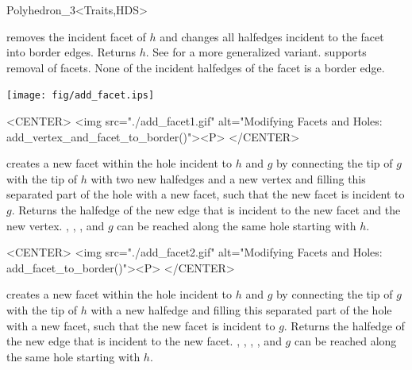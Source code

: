 \begin{ccClassTemplate}{Polyhedron_3<Traits,HDS>}

    {removes the incident facet of $h$ and changes all halfedges incident 
    to the facet into border edges. Returns $h$. 
    See  for a more generalized variant.    
    \ccPrecond {} supports removal of facets. None of the 
    incident halfedges of the facet is a border edge.}


\begin{ccTexOnly}
    \begin{center}
      \parbox{\textwidth}{%
          \texttt{[image: fig/add\_facet.ips]}%
      }
    \end{center}
\end{ccTexOnly}

\begin{ccHtmlOnly}
    <CENTER>
    <img src="./add_facet1.gif" 
     alt="Modifying Facets and Holes: add_vertex_and_facet_to_border()"><P>
    </CENTER>
\end{ccHtmlOnly}


   {creates a new facet within the hole incident to $h$
   and $g$ by connecting the tip of $g$ with the tip of $h$ 
   with two new halfedges and a new vertex and filling this separated
   part of the hole with a new facet, such that the new facet is
   incident to $g$. Returns the halfedge of the new edge that is
   incident to the new facet and the new vertex.
    \ccPrecond {}, , , 
    and $g$ can be reached along the same hole starting with $h$.}

\begin{ccHtmlOnly}
    <CENTER>
    <img src="./add_facet2.gif" 
     alt="Modifying Facets and Holes: add_facet_to_border()"><P>
    </CENTER>
\end{ccHtmlOnly}

   {creates a new facet within the hole incident to $h$
   and $g$ by connecting the tip of $g$ with the tip of $h$ 
   with a new halfedge and filling this separated part
   of the hole with a new facet, such that the new
   facet is incident to $g$. Returns the halfedge of the new edge that
   is incident to the new facet.
   \ccPrecond {}, , , 
   , and $g$ can be reached along the same hole
   starting with $h$.}



\end{ccClassTemplate}

